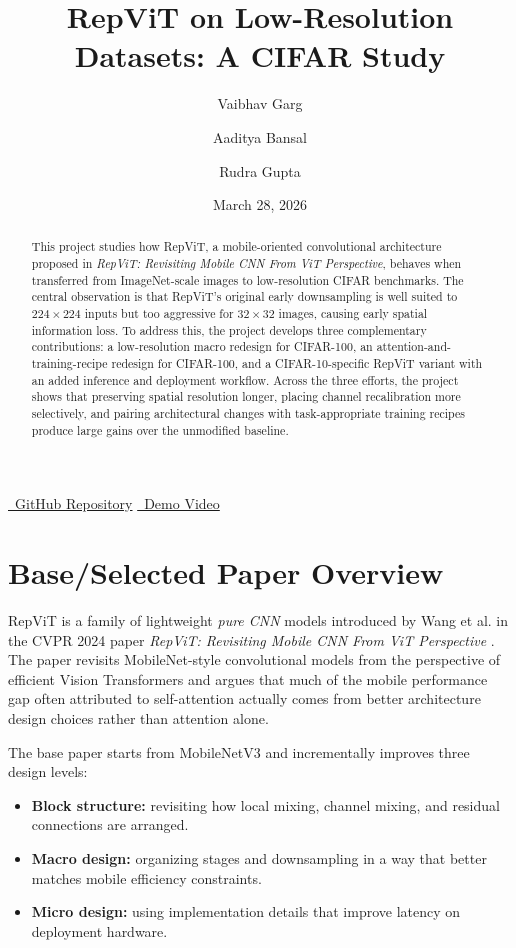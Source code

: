 \documentclass[10pt,a4paper,twocolumn]{article}
\title{\textbf{RepViT on Low-Resolution Datasets: A CIFAR Study}}
\author{Vaibhav Garg \and Aaditya Bansal \and Rudra Gupta}
\date{March 28, 2026}
\begin{document}
\maketitle

\begin{center}
\small \href{https://github.com/rudra-dotcom/DL-Project.git}{\faGithub\ GitHub Repository}
\hspace{1.5em}
\href{<ADD-YOUTUBE-LINK-HERE>}{\faYoutube\ Demo Video}
\end{center}

\begin{abstract}
This project studies how RepViT, a mobile-oriented convolutional architecture proposed in \emph{RepViT: Revisiting Mobile CNN From ViT Perspective}, behaves when transferred from ImageNet-scale images to low-resolution CIFAR benchmarks. The central observation is that RepViT's original early downsampling is well suited to \(224\times224\) inputs but too aggressive for \(32\times32\) images, causing early spatial information loss. To address this, the project develops three complementary contributions: a low-resolution macro redesign for CIFAR-100, an attention-and-training-recipe redesign for CIFAR-100, and a CIFAR-10-specific RepViT variant with an added inference and deployment workflow. Across the three efforts, the project shows that preserving spatial resolution longer, placing channel recalibration more selectively, and pairing architectural changes with task-appropriate training recipes produce large gains over the unmodified baseline.
\end{abstract}

\section{Base/Selected Paper Overview}

RepViT is a family of lightweight \emph{pure CNN} models introduced by Wang et al. in the CVPR 2024 paper \emph{RepViT: Revisiting Mobile CNN From ViT Perspective} \cite{repvit}. The paper revisits MobileNet-style convolutional models from the perspective of efficient Vision Transformers and argues that much of the mobile performance gap often attributed to self-attention actually comes from better architecture design choices rather than attention alone.

The base paper starts from MobileNetV3 and incrementally improves three design levels:
\begin{itemize}[leftmargin=1.2em]
    \item \textbf{Block structure:} revisiting how local mixing, channel mixing, and residual connections are arranged.
    \item \textbf{Macro design:} organizing stages and downsampling in a way that better matches mobile efficiency constraints.
    \item \textbf{Micro design:} using implementation details that improve latency on deployment hardware.
\end{itemize}
\end{document}

